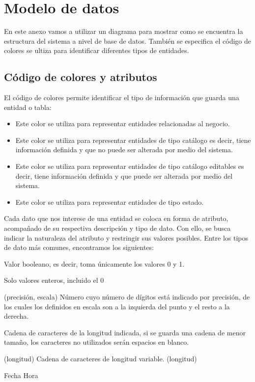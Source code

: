 

\chapter{Modelo de datos}
En este anexo vamos a utilizar un diagrama para mostrar como se encuentra la estructura del sistema a nivel de base de datos. 
También se especifica el código de colores se ultiza para identificar diferentes tipos de entidades.

\section{Código de colores y atributos}

El código de colores permite identificar el tipo de información que guarda una entidad o tabla:


\begin{itemize}
    \item \IUEntidaB{} Este color se utiliza para representar entidades relacionadas al negocio.
    \item \IUEntidaA{} Este color se utiliza para representar entidades de tipo catálogo es decir, tiene información definida 
    y que no puede ser alterada por medio del sistema.
    \item \IUEntidaC{} Este color se utiliza para representar entidades de tipo catálogo editables es decir, tiene información definida 
    y que puede ser alterada por medio del sistema.
    \item \IUEntidaD{} Este color se utiliza para representar entidades de tipo estado.
\end{itemize}

Cada dato que nos interese de una entidad se coloca en forma de atributo, acompañado de su respectiva descripción y tipo de dato. Con ello, se busca indicar la naturaleza del atributo y restringir sus valores posibles. Entre los tipos de dato más comunes, encontramos los siguientes:

    \begin{bGlosario}
	    Valor booleano, es decir, toma únicamente los valores 0 y 1.

            Solo valores enteros, incluido el 0
            
         (precisión, escala)
            Número cuyo número de dígitos está indicado por precisión, de los cuales
            los definidos en escala son a la izquierda del punto y el resto a la derecha.
            
            Cadena de caracteres de la longitud indicada, si se guarda una cadena de menor
            tamaño, los caracteres no utilizados serán espacios en blanco.
            
         (longitud)
            Cadena de caracteres de longitud variable. 
         (longitud)
            
         Fecha
         Hora
    \end{bGlosario}

